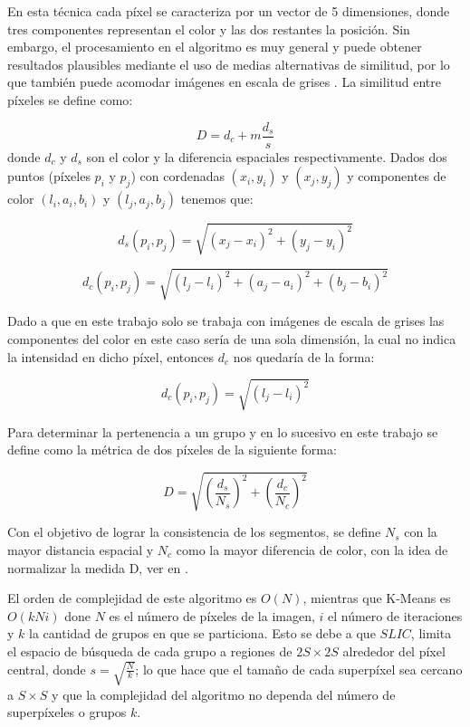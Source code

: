 \documentclass[a4paper,10pt,twocolumn]{article}
\begin{document}
En esta t\'ecnica cada p\'ixel se caracteriza por un vector de 5 dimensiones, donde tres componentes representan el color y las dos restantes la posici\'on. Sin embargo, el procesamiento en el algoritmo es muy general y puede obtener resultados plausibles mediante el uso de medias alternativas de similitud, por lo que tambi\'en puede acomodar im\'agenes en escala de grises \cite{mark}. La similitud entre p\'ixeles se define como:

\begin{equation}
	D = d_c + m\frac{d_s}{s}
\end{equation}
donde $d_c$ y $d_s$ son el color y la diferencia espaciales respectivamente. Dados dos puntos (p\'ixeles $p_i$ y $p_j$) con cordenadas $(x_i, y_i)$ y $(x_j, y_j)$ y componentes de color $(l_i, a_i, b_i)$ y $(l_j, a_j, b_j)$ tenemos que:

\begin{equation}
	d_s(p_i, p_j) = \sqrt{(x_j - x_i)^2 + (y_j - y_i)^2}
\end{equation}

\begin{equation}
	d_c(p_i, p_j) = \sqrt{(l_j - l_i)^2 + (a_j - a_i)^2 + (b_j - b_i)^2}
\end{equation}

Dado a que en este trabajo solo se trabaja con im\'agenes de escala de grises las componentes del color en este caso ser\'ia de una sola dimensi\'on, la cual no indica la intensidad en dicho p\'ixel, entonces $d_c$ nos quedar\'ia de la forma:

\begin{equation}
	d_c(p_i, p_j) = \sqrt{(l_j - l_i)^2}
\end{equation}

Para determinar la pertenencia a un grupo y en lo sucesivo en este trabajo se define como la m\'etrica de dos p\'ixeles de la siguiente forma:

\begin{equation}
	D = \sqrt{\left (\frac{d_s}{N_s} \right )^2 + \left (\frac{d_c}{N_c} \right )^2}
\end{equation}

Con el objetivo de lograr la consistencia de los segmentos, se define $N_s$ con la mayor distancia espacial y $N_c$ como la mayor diferencia de color, con la idea de normalizar la medida D, ver en \cite{achanta}.

El orden de complejidad de este algoritmo es $O(N)$, mientras que K-Means es $O(kNi)$ done $N$ es el n\'umero de p\'ixeles de la imagen, $i$ el n\'umero de iteraciones y $k$ la cantidad de grupos en que se particiona. Esto se debe a que $SLIC$, limita el espacio de b\'usqueda de cada grupo a regiones de $2S \times 2S$ alrededor del p\'ixel central, donde $s = \sqrt{\frac{N}{k}}$; lo que hace que el tama\~no de cada superp\'ixel sea cercano a $S \times S$ y que la complejidad del algoritmo no dependa del número de superp\'ixeles o grupos $k$.
\end{document}

